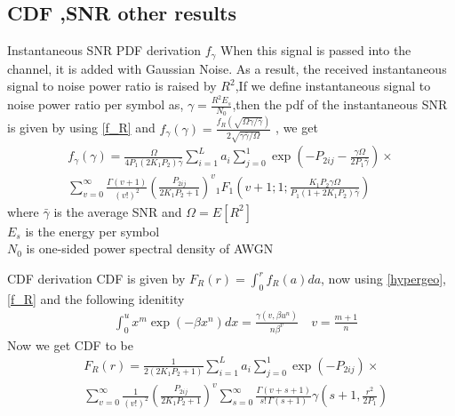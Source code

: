 \documentclass{beamer}
\begin{document}
\subsection{CDF ,SNR other results}
\begin{frame}{}
\begin{block}{Instantaneous SNR PDF derivation \(f_{\gamma}\)}
When  this  signal  is  passed  into  the  channel,  it  is  added  with  Gaussian Noise. As a result, the received instantaneous signal to noise power ratio is raised by \(R^2\),If we define instantaneous signal to noise power ratio per symbol as, \(\gamma=\frac{R^2 E_s}{N_0}\),then the pdf of the instantaneous SNR is given by using \eqref{f_R} and \(f_{\gamma}(\gamma) =\frac{f_R(\sqrt{\Omega\gamma/\bar{\gamma}})}{2\sqrt{\gamma\bar{\gamma}/\Omega}} \) , we get
\begin{align}
    f_{\gamma}(\gamma)=\frac{\Omega}{4P_1(2K_1 P_2)\bar{\gamma}} 
    \sum_{i=1}^{L} a_i  \sum_{j=0}^{1} 
       \exp(-P_{2ij}-\frac{\gamma\Omega}{2P_1\bar{\gamma}})  \times \label{f_gamma} \\ \nonumber
      \sum_{v=0}^\infty \frac{\Gamma(v+1)}{(v!)^2}\left(\frac{P_{2ij}}{2K_1P_2+1}\right)^v {}_{1}F_{1}
      \left( v+1;1;\frac{K_1P_2 \gamma\Omega}{P_1(1+2K_1P_2)\bar{\gamma}}\right)
\end{align}
where \(\bar{\gamma}\) is the average SNR and \(\Omega =E[R^2]\)\\
\(E_s\) is  the  energy  per  symbol\\
\(N_0\) is one-sided  power  spectral  density of AWGN
\end{block}
\end{frame}
\begin{frame}
\begin{block}{CDF derivation}
CDF is given by \(F_R(r)=\int_0^r f_R(a)da\), now using \eqref{hypergeo},\eqref{f_R} and the following idenitity
\begin{align}
     &\int_0^{u} x^m \exp(-\beta x^{n})dx =\frac{\gamma(v,\beta u^n)}{n\beta^v} \quad v=\frac{m+1}{n} \label{int_2}
\end{align}
Now we get CDF to be
\begin{align}
     &F_R(r)=\frac{1}{2(2K_1P_2+1)} \sum_{i=1}^{L} a_i  \sum_{j=0}^{1} 
     \exp(-P_{2ij})  \times \label{F_R}\\ \nonumber
    &\sum_{v=0}^\infty \frac{1}{(v!)^2}\left(\frac{P_{2ij}}{2K_1P_2+1}\right)^v
    \sum_{s=0}^\infty  \frac{\Gamma(v+s+1)}{s!\,\Gamma(s+1)} \gamma\left(s+1,\frac{r^2}{2P_1}\right)
\end{align}
\end{block}
\end{frame}
\end{document}

